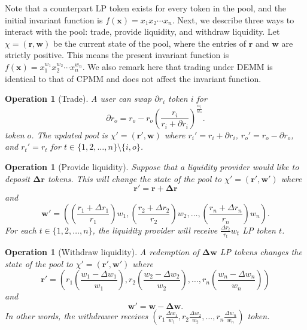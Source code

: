 \documentclass[12pt,a4paper]{article}
\newtheorem{operation}[corollary]{Operation}
\begin{document}
Note that a counterpart LP token exists for every token in the pool, and the initial invariant function is $f(\mathbf{x})=x_1x_2\cdots x_n$. Next, we describe three ways to interact with the pool: trade, provide liquidity, and withdraw liquidity. Let $\chi=(\mathbf{r},\mathbf{w})$ be the current state of the pool, where the entries of $\mathbf{r}$ and $\mathbf{w}$ are strictly positive. This means the present invariant function is $f(\mathbf{x})=x_1^{w_1}x_2^{w_2}\cdots x_n^{w_n}$. We also remark here that trading under DEMM is identical to that of CPMM and does not affect the invariant function.

\begin{operation}[Trade]\label{o:trade2}
A user can swap $\partial r_i$ token $i$ for
\begin{equation}\label{e:trade2}
\partial r_o=r_o-r_o\left(\frac{r_i}{r_i+\partial r_i}\right)^\frac{w_i}{w_o}.
\end{equation}
token $o$. The updated pool is $\chi'=(\mathbf{r'},\mathbf{w})$ where $r_i'=r_i+\partial r_i$, $r_o'=r_o-\partial r_o$, and $r_t'=r_t$ for $t\in\{1,2,\ldots,n\}\setminus\{i,o\}$.
\end{operation}

\begin{operation}[Provide liquidity]\label{o:provide2}
Suppose that a liquidity provider would like to deposit $\mathbf{\Delta r}$ tokens. This will change the state of the pool to $\chi'=(\mathbf{r'},\mathbf{w'})$ where
\[\mathbf{r'}=\mathbf{r}+\mathbf{\Delta r}\]
and
\begin{equation}\label{e:provide2}
\mathbf{w'}=\left(\left(\frac{r_1+\Delta r_1}{r_1}\right)w_1,\left(\frac{r_2+\Delta r_2}{r_2}\right)w_2,\ldots,\left(\frac{r_n+\Delta r_n}{r_n}\right)w_n\right).
\end{equation}
For each $t\in\{1,2,\ldots,n\}$, the liquidity provider will receive $\frac{\Delta r_t}{r_t}w_t$ LP token $t$.
\end{operation}

\begin{operation}[Withdraw liquidity]\label{o:withdraw2}
A redemption of $\mathbf{\Delta w}$ LP tokens changes the state of the pool to $\chi'=(\mathbf{r'},\mathbf{w'})$ where
\[\mathbf{r'}=\left(r_1\left(\frac{w_1-\Delta w_1}{w_1}\right),r_2\left(\frac{w_2-\Delta w_2}{w_2}\right),\ldots,r_n\left(\frac{w_n-\Delta w_n}{w_n}\right)\right)\]
and
\begin{equation}\label{e:withdraw2}
\mathbf{w'}=\mathbf{w}-\mathbf{\Delta w}.
\end{equation}
In other words, the withdrawer receives $\left(r_1\frac{\Delta w_1}{w_1},r_2\frac{\Delta w_2}{w_2},\ldots,r_n\frac{\Delta w_n}{w_n}\right)$ token.
\end{operation}
\end{document}
